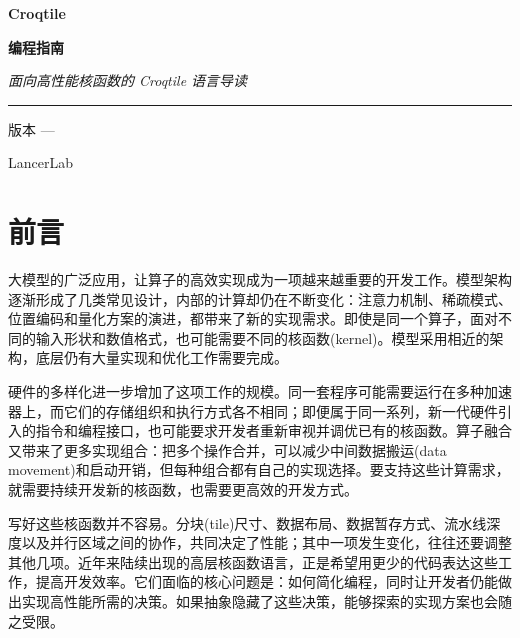 \frontmatter
\begin{titlepage}
\centering
\vspace*{1.4cm}
{\sffamily\bfseries\fontsize{36}{40}\selectfont\color{croqink} Croqtile\par}
\vspace{0.1cm}
{\sffamily\bfseries\fontsize{26}{30}\selectfont\color{croqgreen} 编程指南\par}
\vspace{0.8cm}
{\Large\itshape 面向高性能核函数的 Croqtile 语言导读\par}
\vspace{1.1cm}
\rule{0.72\linewidth}{0.6pt}\par
\vspace{0.9cm}
{\large 版本 \guideversion{} --- \guidereleasedate\par}
\vfill
{\small\color{croqgray} LancerLab\par}
\vspace{1.0cm}
\end{titlepage}
\thispagestyle{empty}
\cleardoublepage

\chapter*{前言}


大模型的广泛应用，让算子的高效实现成为一项越来越重要的开发工作。模型架构逐渐形成了几类常见设计，内部的计算却仍在不断变化：注意力机制、稀疏模式、位置编码和量化方案的演进，都带来了新的实现需求。即使是同一个算子，面对不同的输入形状和数值格式，也可能需要不同的核函数(kernel)。模型采用相近的架构，底层仍有大量实现和优化工作需要完成。

硬件的多样化进一步增加了这项工作的规模。同一套程序可能需要运行在多种加速器上，而它们的存储组织和执行方式各不相同；即便属于同一系列，新一代硬件引入的指令和编程接口，也可能要求开发者重新审视并调优已有的核函数。算子融合又带来了更多实现组合：把多个操作合并，可以减少中间数据搬运(data movement)和启动开销，但每种组合都有自己的实现选择。要支持这些计算需求，就需要持续开发新的核函数，也需要更高效的开发方式。

写好这些核函数并不容易。分块(tile)尺寸、数据布局、数据暂存方式、流水线深度以及并行区域之间的协作，共同决定了性能；其中一项发生变化，往往还要调整其他几项。近年来陆续出现的高层核函数语言，正是希望用更少的代码表达这些工作，提高开发效率。它们面临的核心问题是：如何简化编程，同时让开发者仍能做出实现高性能所需的决策。如果抽象隐藏了这些决策，能够探索的实现方案也会随之受限。

